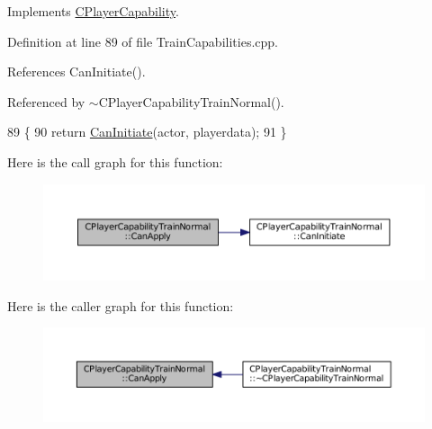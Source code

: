 Implements \hyperlink{classCPlayerCapability_ae96263e0950f496492f8baeb877b9554}{C\+Player\+Capability}.



Definition at line 89 of file Train\+Capabilities.\+cpp.



References Can\+Initiate().



Referenced by $\sim$\+C\+Player\+Capability\+Train\+Normal().


\begin{DoxyCode}
89                                                                                                            
                                                        \{
90     \textcolor{keywordflow}{return} \hyperlink{classCPlayerCapabilityTrainNormal_ac49cf646b94220844a03b7c3a8a7f215}{CanInitiate}(actor, playerdata);
91 \}
\end{DoxyCode}
Here is the call graph for this function\+:\nopagebreak
\begin{figure}[H]
\begin{center}
\leavevmode
\includegraphics[width=350pt]{classCPlayerCapabilityTrainNormal_a625d2154bed47357f45662fe5dee7c1b_cgraph}
\end{center}
\end{figure}
Here is the caller graph for this function\+:\nopagebreak
\begin{figure}[H]
\begin{center}
\leavevmode
\includegraphics[width=350pt]{classCPlayerCapabilityTrainNormal_a625d2154bed47357f45662fe5dee7c1b_icgraph}
\end{center}
\end{figure}
\hypertarget{classCPlayerCapabilityTrainNormal_ac49cf646b94220844a03b7c3a8a7f215}{}\label{classCPlayerCapabilityTrainNormal_ac49cf646b94220844a03b7c3a8a7f215} 
